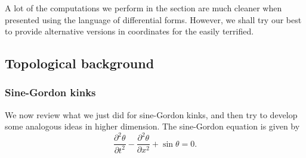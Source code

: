 \documentclass[a4paper]{article}
\begin{document}
A lot of the computations we perform in the section are much cleaner when presented using the language of differential forms. However, we shall try our best to provide alternative versions in coordinates for the easily terrified.

\subsection{Topological background}
\subsubsection*{Sine-Gordon kinks}
We now review what we just did for sine-Gordon kinks, and then try to develop some analogous ideas in higher dimension. The sine-Gordon equation is given by
\[
  \frac{\partial^2 \theta}{\partial t^2} - \frac{\partial^2 \theta}{\partial x^2} + \sin \theta = 0.
\]
\end{document}
